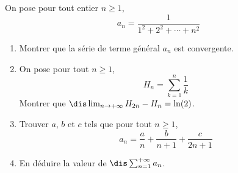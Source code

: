 \documentclass[a4paper,10pt]{report}
\begin{document}
\begin{Exa} On pose pour tout entier $n \geq 1$,
$$ a_n = \dfrac{1}{1^2+2^2 + \cdots + n^2}$$
\begin{enumerate}
\item Montrer que la série de terme général $a_n$ est convergente.
\item On pose pour tout $n \geq 1$,
$$ H_n = \sum_{k=1}^n \dfrac{1}{k}$$
Montrer que $\dis \lim_{n \rightarrow + \infty} H_{2n}-H_n = \ln(2)$.
\item Trouver $a$, $b$ et $c$ tels que pour tout $n \geq 1$,
$$ a_n = \dfrac{a}{n} + \dfrac{b}{n+1} + \dfrac{c}{2n+1}$$
\item En déduire la valeur de $\dis \sum_{n=1}^{+ \infty} a_n$.
\end{enumerate}
\end{Exa}
\end{document}
